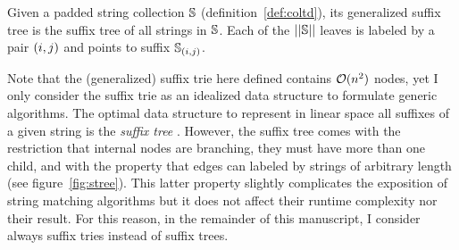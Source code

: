 \begin{definition}
Given a padded string collection $\mathbb{S}$ (definition~\ref{def:coltd}), its generalized suffix tree is the suffix tree of all strings in $\mathbb{S}$.
Each of the $||\mathbb{S}||$ leaves is labeled by a pair $(i,j)$ and points to suffix ${\mathbb{S}}_{(i,j)}$.

\end{definition}

\begin{figure}[b]
\caption[Example of suffix trie and suffix tree]{Suffix trie and suffix tree of the string {\ttfamily ANANAS\$} .}
\label{fig:stree}
\begin{subfigure}[b]{.5\textwidth}
\begin{center}

\end{center}
\end{subfigure}%
\begin{subfigure}[b]{.5\textwidth}
\begin{center}

\vspace{6mm}
\end{center}
\end{subfigure}
\end{figure}

Note that the (generalized) suffix trie here defined contains $\mathcal{O}(n^2)$ nodes, yet I only consider the suffix trie as an idealized data structure to formulate generic algorithms.
The optimal data structure to represent in linear space all suffixes of a given string is the \emph{suffix tree} \citep{Morrison1968}.
However, the suffix tree comes with the restriction that internal nodes are branching, \ie they must have more than one child, and with the property that edges can labeled by strings of arbitrary length (see figure~\ref{fig:stree}).
This latter property slightly complicates the exposition of string matching algorithms but it does not affect their runtime complexity nor their result.
For this reason, in the remainder of this manuscript, I consider \wlogs always suffix tries instead of suffix trees.

